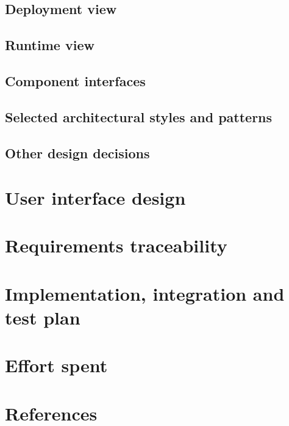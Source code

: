 \documentclass[12pt, a4paper]{report}
\begin{document}
    \section{Deployment view}
    \section{Runtime view}
    \section{Component interfaces}
    \section{Selected architectural styles and patterns}
    \section{Other design decisions}

\newpage 

\chapter{User interface design}

\newpage 

\chapter{Requirements traceability}

\newpage 

\chapter{Implementation, integration and test plan}

\newpage 

\chapter{Effort spent}

\newpage 

\chapter{References}
\end{document}
